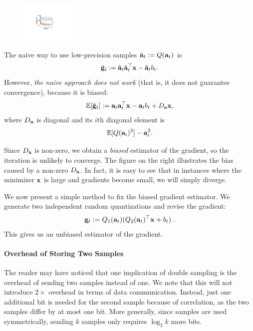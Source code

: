 \documentclass{article}
\def\a{{\bf a}}
\def\g{{\bf g}}
\def\x{{\bf x}}
\def\E{\mathbb{E}}
\begin{document}
\begin{figure}
  \begin{center}
    \includegraphics[width=0.23\textwidth]{micro-experiments/gap.pdf}
  \end{center}
  \label{fig:gap}
\end{figure}
The naive way to use low-precision samples $\hat{\a}_t := Q(\a_t)$ is 
\[
\hat{\g}_t := \hat{\a}_t \hat{\a}_t^\top \x - \hat{\a}_t b_t.
\]
However, \emph{the naive approach does not work} (that is, it does not guarantee convergence), because it is biased: 
\[
\E[\hat{\g}_t] := \a_t \a_t^\top \x - \a_t b_t + D_{\a} \x, 
\]
where $D_{\a}$ is diagonal and its $i$th diagonal element is 
\[
\E[ Q(\a_i)^2 ] - \a_i^2.
\]

\vspace{-0.5em}
Since $D_{\a}$ is non-zero, we obtain a \emph{biased} estimator of the gradient, so the iteration is unlikely to converge. 
The figure on the right illustrates the bias caused by a non-zero $D_{\a}$. In fact, it is easy to see that in instances where the minimizer $\x$ is large and gradients become small, we will simply diverge. 

We now present a simple method to fix the biased gradient estimator. We generate two independent random quantizations and revise the gradient:
\begin{align}
\g_t := Q_1 (\a_t) (Q_2 (\a_t)^\top \x + b_t) \; .
\label{eq:double}
\end{align}
This gives us an unbiased estimator of the gradient. 

\paragraph*{Overhead of Storing Two Samples}
The reader may have noticed that one implication of double sampling is the overhead of sending
two samples instead of one. We note that this will not introduce $2\times$
overhead in terms of data communication. Instead, just one additional bit
is needed for the second sample because of correlation, as the two samples 
differ by at most one bit. More generally, since samples
are used symmetrically, sending $k$ samples only requires $\log_2 k$ more bits.
\end{document}
